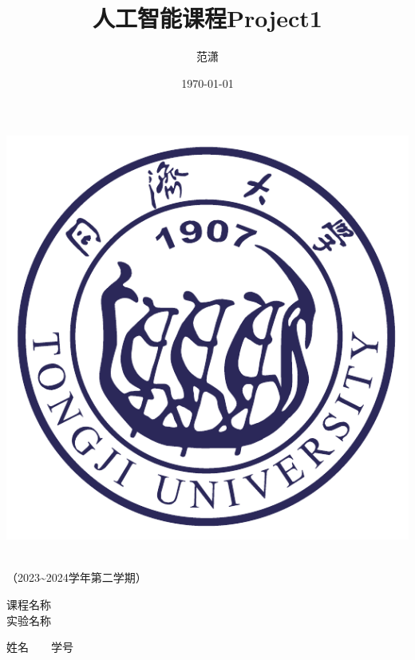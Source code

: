 \documentclass[a4paper]{report}
\author{\Large{范潇\quad2254298}}
\title{\sffamily\Huge\bfseries{人工智能课程Project1}}
\date{\Large{\today}}
\begin{document}
\begin{titlepage}
    \heiti
    \vspace*{64pt}
    \begin{center}
        \includegraphics{./pic/tongji-logo-purple.pdf}

        \vspace*{36pt}
        \\
        \vspace*{48pt}
        \LARGE（2023\~{}2024学年第二学期）\\
        \vspace*{48pt}
    
        \LARGE 课程名称\ \ \underline{}\\
        \LARGE 实验名称\ \ \underline{}\\
        \vspace*{36pt}
    
        \Large 姓名\ \ \underline{}\ \ 学号\ \ \underline{}\\
    \end{center}
\end{titlepage}





\end{document}
